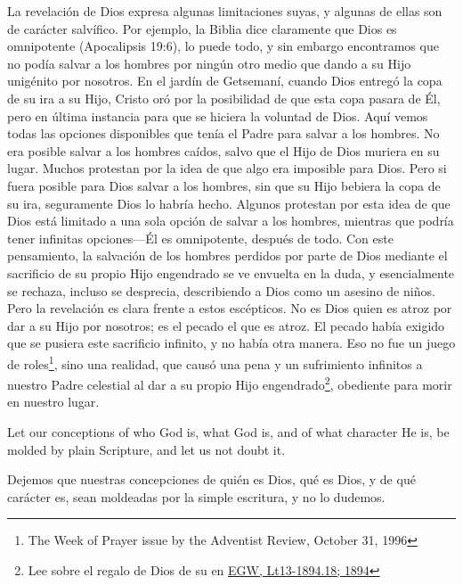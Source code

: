 La revelación de Dios expresa algunas limitaciones suyas, y algunas de ellas son de carácter salvífico. Por ejemplo, la Biblia dice claramente que Dios es omnipotente (Apocalipsis 19:6), lo puede todo, y sin embargo encontramos que no podía salvar a los hombres por ningún otro medio que dando a su Hijo unigénito por nosotros. En el jardín de Getsemaní, cuando Dios entregó la copa de su ira a su Hijo, Cristo oró por la posibilidad de que esta copa pasara de Él, pero en última instancia para que se hiciera la voluntad de Dios. Aquí vemos todas las opciones disponibles que tenía el Padre para salvar a los hombres. No era posible salvar a los hombres caídos, salvo que el Hijo de Dios muriera en su lugar. Muchos protestan por la idea de que algo era imposible para Dios. Pero si fuera posible para Dios salvar a los hombres, sin que su Hijo bebiera la copa de su ira, seguramente Dios lo habría hecho. Algunos protestan por esta idea de que Dios está limitado a una sola opción de salvar a los hombres, mientras que podría tener infinitas opciones—Él es omnipotente, después de todo. Con este pensamiento, la salvación de los hombres perdidos por parte de Dios mediante el sacrificio de su propio Hijo engendrado se ve envuelta en la duda, y esencialmente se rechaza, incluso se desprecia, describiendo a Dios como un asesino de niños. Pero la revelación es clara frente a estos escépticos. No es Dios quien es atroz por dar a su Hijo por nosotros; es el pecado el que es atroz. El pecado había exigido que se pusiera este sacrificio infinito, y no había otra manera. Eso no fue un juego de roles\footnote{The Week of Prayer issue by the Adventist Review, October 31, 1996}, sino una realidad, que causó una pena y un sufrimiento infinitos a nuestro Padre celestial al dar a su propio Hijo engendrado\footnote{Lee sobre el regalo de Dios de su  en \href{https://egwwritings.org/?ref=en_Lt13-1894.18&para=5486.24}{{EGW, Lt13-1894.18; 1894}}}, obediente para morir en nuestro lugar.


Let our conceptions of who God is, what God is, and of what character He is, be molded by plain Scripture, and let us not doubt it.


Dejemos que nuestras concepciones de quién es Dios, qué es Dios, y de qué carácter es, sean moldeadas por la simple escritura, y no lo dudemos.






